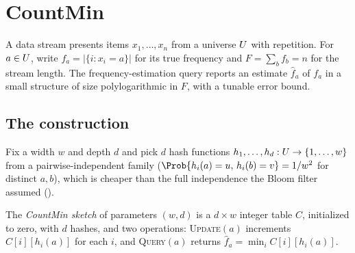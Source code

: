 %

\section{CountMin}
\label{sec:countmin}

A data stream presents items $x_1, \ldots, x_n$ from a universe $U$
with repetition. For $a \in U$, write $f_a = |\{i : x_i = a\}|$ for its
true frequency and $F = \sum_b f_b = n$ for the stream length. The
frequency-estimation query reports an estimate $\hat f_a$ of $f_a$ in a small
structure of size polylogarithmic in $F$, with a tunable error bound.

\subsection*{The construction}

Fix a width $w$ and depth $d$ and pick $d$ hash functions $h_1, \ldots, h_d :
U \to \{1, \ldots, w\}$ from a pairwise-independent family
($\Prob{h_i(a) = u,\, h_i(b) = v} = 1/w^2$ for distinct $a, b$), which is
cheaper than the full independence the Bloom filter assumed
().

\begin{definition}
\label{def:countmin}
The \emph{CountMin sketch} of parameters $(w, d)$ is a $d \times w$ integer
table $C$, initialized to zero, with $d$ hashes, and two operations:
\textsc{Update}$(a)$ increments $C[i][h_i(a)]$ for each $i$, and
\textsc{Query}$(a)$ returns $\hat f_a = \min_i C[i][h_i(a)]$.
\end{definition}

\begin{algorithm}[ht]
  \caption{CountMin update and query}
  \label{alg:countmin-update-query}
  \BlankLine
\end{algorithm}

